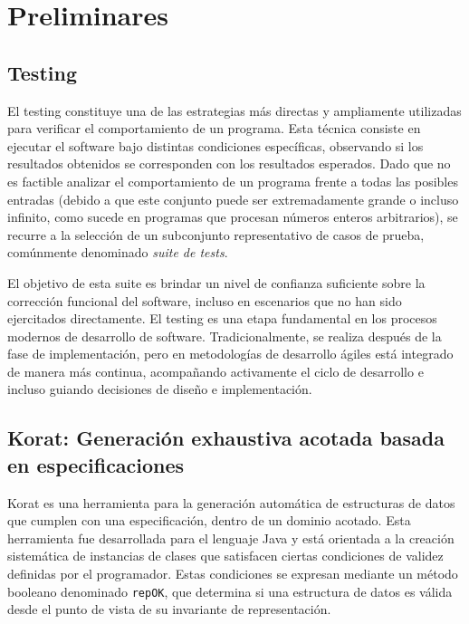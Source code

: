 \chapter[Preliminares]{Preliminares}
\label{cap:preliminares.BE}

\section{Testing}
El testing constituye una de las estrategias más directas y ampliamente utilizadas para verificar el comportamiento de un programa.
Esta técnica consiste en ejecutar el software bajo distintas condiciones específicas, observando si los resultados obtenidos se corresponden con los resultados esperados. 
Dado que no es factible analizar el comportamiento de un programa frente a todas las posibles entradas (debido a que este conjunto puede ser extremadamente grande o incluso infinito, como sucede en programas que procesan números enteros arbitrarios), 
se recurre a la selección de un subconjunto representativo de casos de prueba, comúnmente denominado \emph{suite de tests}.

El objetivo de esta suite es brindar un nivel de confianza suficiente sobre la corrección funcional del software, 
incluso en escenarios que no han sido ejercitados directamente. 
El testing es una etapa fundamental en los procesos modernos de desarrollo de software. 
Tradicionalmente, se realiza después de la fase de implementación, pero en metodologías de desarrollo ágiles está integrado de manera más continua, 
acompañando activamente el ciclo de desarrollo e incluso guiando decisiones de diseño e implementación.



\section{Korat: Generación exhaustiva acotada basada en especificaciones}
\label{sec:korat}


Korat es una herramienta para la generación automática de estructuras de datos que cumplen con una especificación, dentro de un dominio acotado. 
Esta herramienta fue desarrollada para el lenguaje Java y está orientada a la creación sistemática de instancias de clases que satisfacen ciertas condiciones de validez definidas por el programador. 
Estas condiciones se expresan mediante un método booleano denominado \texttt{repOK}, que determina si una estructura de datos es válida desde el punto de vista de su invariante de representación.

